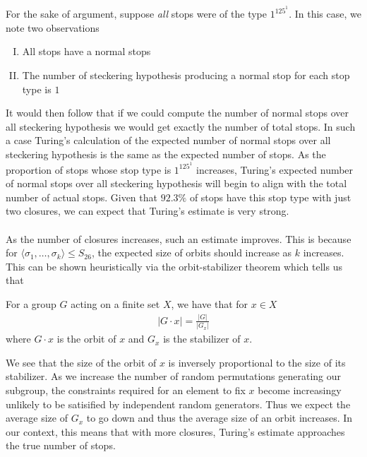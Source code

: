 \\\\For the sake of argument, suppose \emph{all} stops were of the type $1^125^1$. In this case, we note two observations
\begin{enumerate}[(I)]
	\item All stops have a normal stops
	\item The number of steckering hypothesis producing a normal stop for each stop type is $1$
\end{enumerate}
It would then follow that if we could compute the number of normal stops over all steckering hypothesis we would get exactly the number of total stops. In such a case Turing's calculation of the expected number of normal stops over all steckering hypothesis is the same as the expected number of stops. As the proportion of stops whose stop type is $1^125^1$ increases, Turing's expected number of normal stops over all steckering hypothesis will begin to align with the total number of actual stops. Given that $92.3\%$ of stops have this stop type with just two closures, we can expect that Turing's estimate is very strong.
\\\\As the number of closures increases, such an estimate improves. This is because for $\langle \sigma_1, \dots, \sigma_k\rangle\le S_{26}$, the expected size of orbits should increase as $k$ increases. This can be shown heuristically via the orbit-stabilizer theorem which tells us that
\begin{theorem}
	For a group $G$ acting on a finite set $X$, we have that for $x\in X$
	\begin{align*}
		|G\cdot x| = \frac{|G|}{|G_x|}
	\end{align*}
	where $G\cdot x$ is the orbit of $x$ and $G_x$ is the stabilizer of $x$.
\end{theorem}
\noindent We see that the size of the orbit of $x$ is inversely proportional to the size of its stabilizer. As we increase the number of random permutations generating our subgroup, the  constraints required for an element to fix $x$ become increasingy unlikely to be satisified by independent random generators. Thus we expect the average size of $G_x$ to go down and thus the average size of an orbit increases. In our context, this means that with more closures, Turing's estimate approaches the true number of stops.

